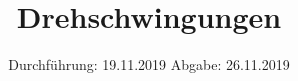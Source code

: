 

\subject{Versuchsnummer: 102}
\title{Drehschwingungen}
\date{%
  Durchführung: 19.11.2019
  \hspace{3em}
  Abgabe: 26.11.2019
}



\maketitle
\thispagestyle{empty}
\tableofcontents
\newpage





\newpage
\nocite{*}
\printbibliography



